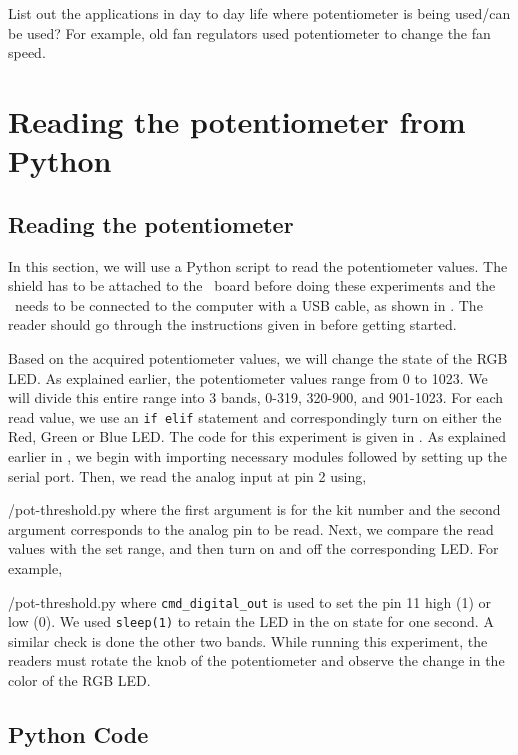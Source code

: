 \begin{exercise}
List out the applications in day to day life where potentiometer is
being used/can be used? For example, old fan regulators used
potentiometer to change the fan speed.
\end{exercise}

\section{Reading the potentiometer from Python}
\subsection{Reading the potentiometer}
In this section, we will use a Python script to read the potentiometer
values. The shield has to be attached to the \arduino\ board
before doing these experiments and the \arduino\ needs to be connected to the computer 
with a USB cable, as shown in .
The reader should go through the instructions given in
 before getting started.

Based on the acquired potentiometer values, we will change
the state of the RGB LED. As explained earlier, the potentiometer
values range from 0 to 1023. We will divide this entire range into 3
bands, 0-319, 320-900, and 901-1023. For each read value, we use an
{\tt if elif} statement and correspondingly turn on either the Red,
Green or Blue LED. The code for this experiment is given in
. As explained earlier in , we begin with 
importing necessary modules followed by setting up the serial port. 
Then, we read the analog input at pin 2 using,

                {\LocPotpycode/pot-threshold.py} where the first
                argument is for
the kit number and the second argument corresponds to the analog pin to be read.  
Next, we compare the read values with the set range, and then turn on and off the corresponding LED. For example, 

{\LocPotpycode/pot-threshold.py} where {\tt cmd\_digital\_out} 
is used to set the pin 11 high (1) or low (0). 
We used {\tt sleep(1)} to retain the LED in the on state for one second.  
A similar check is done the other two bands. 
While running this experiment, 
the readers must rotate the knob of the potentiometer and observe 
the change in the color of the RGB LED. 


\subsection{Python Code}
\label{sec:pot-python-code}
\begin{pycode}
\label{py:pot-100}

\end{pycode}

